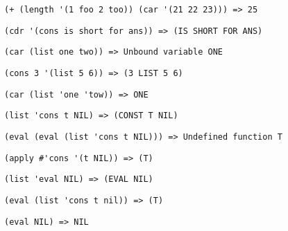 \problem \hfill

\begin{lstlisting}
(+ (length '(1 foo 2 too)) (car '(21 22 23))) => 25
\end{lstlisting}


\problem \hfill

\begin{lstlisting}
(cdr '(cons is short for ans)) => (IS SHORT FOR ANS)
\end{lstlisting}


\problem \hfill

\begin{lstlisting}
(car (list one two)) => Unbound variable ONE
\end{lstlisting}


\problem \hfill

\begin{lstlisting}
(cons 3 '(list 5 6)) => (3 LIST 5 6)
\end{lstlisting}


\problem \hfill

\begin{lstlisting}
(car (list 'one 'tow)) => ONE
\end{lstlisting}


\problem \hfill

\begin{lstlisting}
(list 'cons t NIL) => (CONST T NIL) 
\end{lstlisting}


\problem \hfill

\begin{lstlisting}
(eval (eval (list 'cons t NIL))) => Undefined function T
\end{lstlisting}


\problem \hfill

\begin{lstlisting}
(apply #'cons '(t NIL)) => (T) 
\end{lstlisting}


\problem \hfill
\begin{lstlisting}
(list 'eval NIL) => (EVAL NIL)
\end{lstlisting}


\problem \hfill
\begin{lstlisting}
(eval (list 'cons t nil)) => (T)
\end{lstlisting}


\problem \hfill
\begin{lstlisting}
(eval NIL) => NIL
\end{lstlisting}


